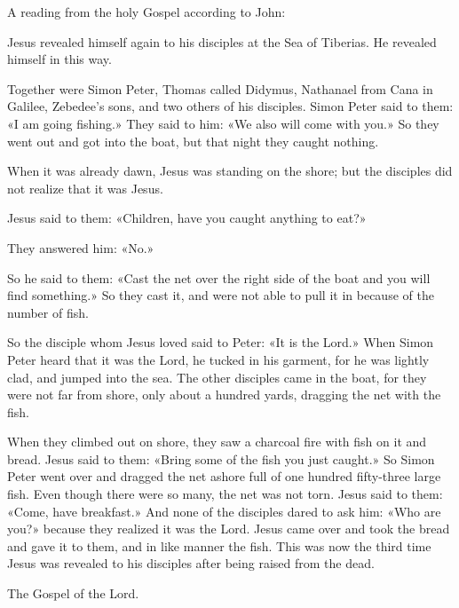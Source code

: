 \indent{} A reading from the holy Gospel according to John:

Jesus revealed himself again to his disciples at the Sea of Tiberias. He revealed himself in this way.

Together were Simon Peter, Thomas called Didymus, Nathanael from Cana in Galilee, Zebedee’s sons, and two others of his disciples. Simon Peter said to them: «I am going fishing.» They said to him: «We also will come with you.» So they went out and got into the boat, but that night they caught nothing.

When it was already dawn, Jesus was standing on the shore; but the disciples did not realize that it was Jesus.

Jesus said to them: «Children, have you caught anything to eat?»

They answered him: «No.»

So he said to them: «Cast the net over the right side of the boat and you will find something.» So they cast it, and were not able to pull it in because of the number of fish.

So the disciple whom Jesus loved said to Peter: «It is the Lord.» When Simon Peter heard that it was the Lord, he tucked in his garment, for he was lightly clad, and jumped into the sea. The other disciples came in the boat, for they were not far from shore, only about a hundred yards, dragging the net with the fish.

When they climbed out on shore, they saw a charcoal fire with fish on it and bread. Jesus said to them: «Bring some of the fish you just caught.» So Simon Peter went over and dragged the net ashore full of one hundred fifty-three large fish. Even though there were so many, the net was not torn. Jesus said to them: «Come, have breakfast.» And none of the disciples dared to ask him: «Who are you?» because they realized it was the Lord. Jesus came over and took the bread and gave it to them, and in like manner the fish. This was now the third time Jesus was revealed to his disciples after being raised from the dead.

The Gospel of the Lord.
